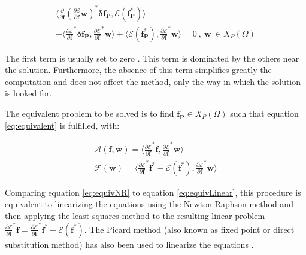 \documentclass{CFD2011}
\begin{document}
\begin{eqnarray}
\big\langle \frac{\partial}{\partial \mathbf{f}} \left(\frac{\partial\mathcal{E}}{\partial \mathbf{f}}\mathbf{w}\right)^*\mathbf{\delta f_P} , \mathcal{E}(\mathbf{f^*_P}) \big\rangle  \nonumber \\
+\big\langle \frac{\partial \mathcal{E}}{\partial \mathbf{f}}^*\mathbf{\delta f_P} , \frac{\partial \mathcal{E}}{\partial \mathbf{f}}^*\mathbf{w} \big\rangle +
\big\langle \mathcal{E}(\mathbf{f^*_P}) , \frac{\partial \mathcal{E}}{\partial \mathbf{f}}^*\mathbf{w} \big\rangle =0 \ ,\ \mathbf{w} \ \in X_P(\Omega)
\end{eqnarray}

The first term is usually set to zero \cite{Winterscheidt1994, Codd2001}. This term is dominated by the others near the solution. Furthermore, the absence of this term simplifies greatly the computation and does not affect the method, only the way in which the solution is looked for.

The equivalent problem to be solved is to find $\mathbf{f_P} \in X_P(\Omega)$ such that equation \ref{eq:equivalent} is fulfilled, with:


\begin{eqnarray}
\mathcal{A}(\mathbf{f},\mathbf{w})= \big\langle \frac{\partial \mathcal{E}}{\partial \mathbf{f}}^*\mathbf{f} ,  \frac{\partial \mathcal{E}}{\partial \mathbf{f}}^*\mathbf{w} \big\rangle \nonumber \\
\mathcal{F}(\mathbf{w})= \big\langle \frac{\partial \mathcal{E}}{\partial \mathbf{f}}^*\mathbf{f^*}-\mathcal{E}(\mathbf{f^*}) , \frac{\partial \mathcal{E}}{\partial \mathbf{f}}^*\mathbf{w} \big\rangle 
\label{eq:equivNR}
\end{eqnarray}


Comparing equation \ref{eq:equivNR} to equation \ref{eq:equivLinear}, this procedure is equivalent to linearizing the equations using the Newton-Raphson method and then applying the least-squares method to the resulting linear problem $ \frac{\partial \mathcal{E}}{\partial \mathbf{f}}^*\mathbf{f}=\frac{\partial \mathcal{E}}{\partial \mathbf{f}}^*\mathbf{f^*}-\mathcal{E}(\mathbf{f^*})$. The Picard method (also known as fixed point or direct substitution method) has also been used to linearize the equations \cite{Sporleder2010}.
\end{document}
